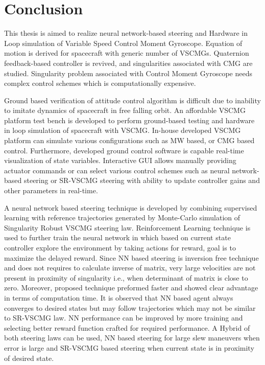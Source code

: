 \chapter{Conclusion}
This thesis is aimed to realize neural network-based steering and Hardware in Loop simulation of Variable Speed Control Moment Gyroscope. Equation of motion is derived for spacecraft with generic number of VSCMGs. Quaternion feedback-based controller is revived, and singularities associated with CMG are studied. Singularity problem associated with Control Moment Gyroscope needs complex control schemes which is computationally expensive.

Ground based verification of attitude control algorithm is difficult due to inability to imitate dynamics of spacecraft in free falling orbit. An affordable VSCMG platform test bench is developed to perform ground-based testing and hardware in loop simulation of spacecraft with VSCMG. In-house developed VSCMG platform can simulate various configurations such as MW based, or CMG based control. Furthermore, developed ground control software is capable real-time visualization of state variables. Interactive GUI allows manually providing actuator commands or can select various control schemes such as neural network-based steering or SR-VSCMG steering with ability to update controller gains and other parameters in real-time.

A neural network based steering technique is developed by combining supervised learning with reference trajectories generated by Monte-Carlo simulation of Singularity Robust VSCMG steering law. Reinforcement Learning technique is used to further train the neural network in which based on current state controller explore the environment by taking actions for reward, goal is to maximize the delayed reward. Since NN based steering is inversion free technique and does not requires to calculate inverse of matrix, very large velocities are not present in proximity of singularity i.e., when determinant of matrix is close to zero. Moreover, proposed technique preformed faster and showed clear advantage in terms of computation time. It is observed that NN based agent always converges to desired states but may follow trajectories which may not be similar to SR-VSCMG law. NN performance can be improved by more training and selecting better reward function crafted for required performance. A Hybrid of both steering laws can be used, NN based steering for large slew maneuvers when error is large and SR-VSCMG based steering when current state is in proximity of desired state.
